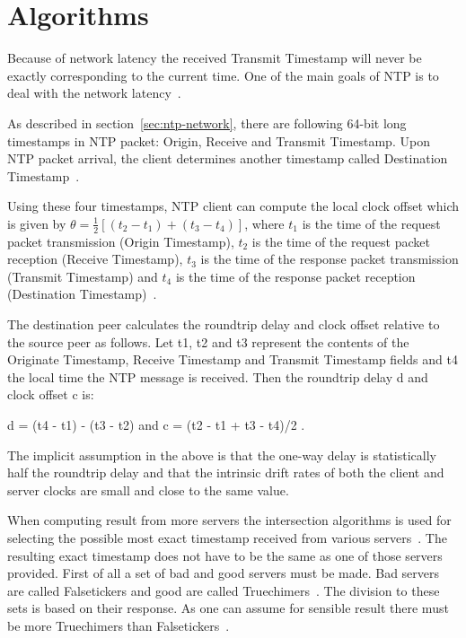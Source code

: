
\section{Algorithms}\label{sec:ntp-algorithms}
Because of network latency the received Transmit Timestamp will never be exactly
corresponding to the current time.
One of the main goals of NTP is to deal with the network latency~\cite{ntp-overview}.

As described in section~\ref{sec:ntp-network},
there are following 64-bit long timestamps in NTP packet: Origin, Receive and Transmit Timestamp.
Upon NTP packet arrival, the client determines another timestamp called
Destination Timestamp~\cite{rfc5905}.

Using these four timestamps, NTP client can compute
the local clock offset which is given by $\theta = \frac{1}{2}[(t_2 - t_1) + (t_3 - t_4)]$,
where $t_1$ is the time of the request packet transmission (Origin Timestamp),
$t_2$ is the time of the request packet reception (Receive Timestamp),
$t_3$ is the time of the response packet transmission (Transmit Timestamp) and
$t_4$ is the time of the response packet reception (Destination Timestamp)~\cite{ntp-algor,rfc5905}.

The destination peer calculates the roundtrip delay and clock
      offset relative to the source peer as follows.  Let t1, t2 and t3
      represent the contents of the Originate Timestamp, Receive
      Timestamp and Transmit Timestamp fields and t4 the local time the
      NTP message is received.  Then the roundtrip delay d and clock
      offset c is:

         d = (t4 - t1) - (t3 - t2)  and  c = (t2 - t1 + t3 - t4)/2 .

      The implicit assumption in the above is that the one-way delay is
      statistically half the roundtrip delay and that the intrinsic
      drift rates of both the client and server clocks are small and
      close to the same value.

When computing result from more servers the intersection algorithms is used
for selecting the possible most exact timestamp received from various servers~\cite{rfc5905}.
The resulting exact timestamp does not have to be the same
as one of those servers provided.
First of all a set of bad and good servers must be made.
Bad servers are called Falsetickers and good are called Truechimers~\cite{rfc5905}.
The division to these sets is based on their response.
As one can assume for sensible result there must be more Truechimers than Falsetickers~\cite{rfc5905}.

